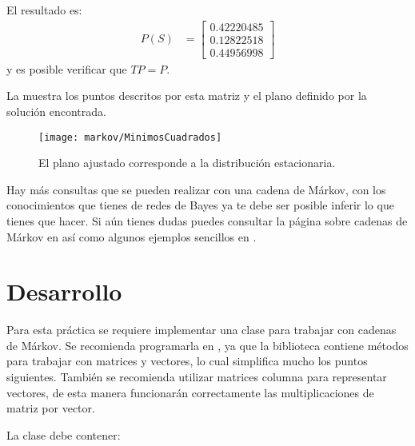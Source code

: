 El resultado es:
\begin{align*}
 P(S) &= \begin{bmatrix}
  0.42220485 \\
  0.12822518 \\
  0.44956998
 \end{bmatrix}
\end{align*}
y es posible verificar que $TP = P$.

La  muestra los puntos descritos por esta matriz y el plano definido por la solución encontrada.

\begin{figure}
 \centering
 \texttt{[image: markov/MinimosCuadrados]}
 \caption{El plano ajustado corresponde a la distribución estacionaria.}\label{fig:MinimosCuadrados}
\end{figure}


Hay más consultas que se pueden realizar con una cadena de Márkov, con los conocimientos que tienes de redes de Bayes ya te debe ser posible inferir lo que tienes que hacer.  Si aún tienes dudas puedes consultar la página sobre cadenas de Márkov en  así como algunos ejemplos sencillos en .



\section{Desarrollo}

Para esta práctica se requiere implementar una clase para trabajar con cadenas de Márkov.  Se recomienda programarla en , ya que la biblioteca  contiene métodos para trabajar con matrices y vectores, lo cual simplifica mucho los puntos siguientes.  También se recomienda utilizar matrices columna para representar vectores, de esta manera funcionarán correctamente las multiplicaciones de matriz por vector.

La clase  debe contener:

